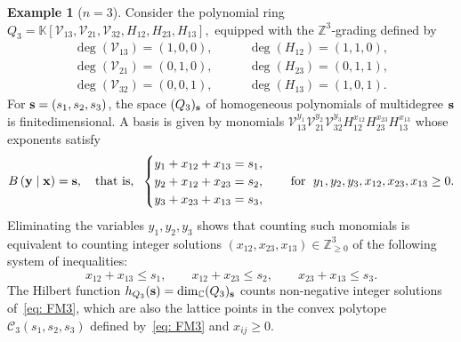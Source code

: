 \documentclass[12pt,a4paper]{extarticle}
\theoremstyle{definition}
\newtheorem{example}[theorem]{Example}
\newcommand{\C}{\mathbb{C}}
\newcommand{\K}{\mathbb{K}}
\begin{document}
\begin{example}[$n=3$] \label{ex: conformal polytope n=3}
Consider the polynomial ring
$
Q_3 = \K[\mathcal{V}_{13},\mathcal{V}_{21},\mathcal{V}_{32},H_{12},H_{23},H_{13}],
$
equipped with the $\mathbb{Z}^3$‑grading defined by
\begin{align*}
\deg(\mathcal{V}_{13})=(1,0,0), &\qquad \deg(H_{12})=(1,1,0),\\
\deg(\mathcal{V}_{21})=(0,1,0), &\qquad \deg(H_{23})=(0,1,1),\\
\deg(\mathcal{V}_{32})=(0,0,1), &\qquad \deg(H_{13})=(1,0,1).
\end{align*}
For ${\bf s}=(s_1,s_2,s_3)$, the space $(Q_3)_{\bf s}$ of homogeneous polynomials of multidegree
${\bf s}$ is finite\-dimensional. A basis is given by monomials
$
\mathcal{V}_{13}^{y_1} \mathcal{V}_{21}^{y_2} \mathcal{V}_{32}^{y_3} H_{12}^{x_{12}} H_{23}^{x_{23}} H_{13}^{x_{13}}
$
whose exponents satisfy
$$
B\,({\bf y}\mid{\bf x}) = {\bf s}, \quad \text{that is, } \;
\begin{cases}
y_1+x_{12}+x_{13}=s_1,\\
y_2+x_{12}+x_{23}=s_2,\\ 
y_3+x_{23}+x_{13}=s_3,  
\end{cases} 
\quad
\text{for } \; y_1,y_2,y_3,x_{12}, x_{23}, x_{13}\ge0.  
$$
Eliminating the variables $y_1,y_2,y_3$ shows that counting such monomials is equivalent to counting
integer solutions $(x_{12}, x_{23}, x_{13})\in\mathbb{Z}_{\ge0}^3$ of the following system of inequalities:
\begin{equation}\label{eq: FM3}
x_{12}+ x_{13}\le s_1,\qquad x_{12}+x_{23}\le s_2,\qquad x_{23}+ x_{13}\le s_3.
\end{equation}
The Hilbert function 
$
h_{Q_3}({\bf s})=\dim_\C (Q_3)_{\bf s}
$
counts non-negative integer solutions of~\eqref{eq: FM3}, which are also the lattice points in the convex polytope
$
\mathcal{C}_3(s_1,s_2,s_3)$ defined by~\eqref{eq: FM3} and $x_{ij}\geq 0$.
\end{example} 
\end{document}
